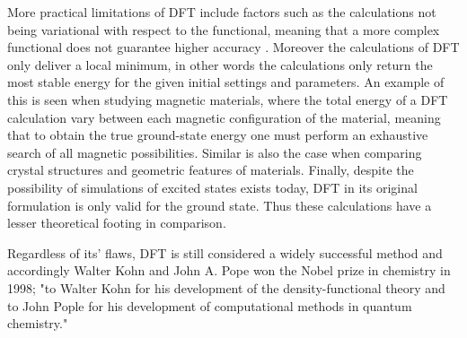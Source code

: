 More practical limitations of DFT include factors such as the calculations not being variational with respect to the functional, meaning that a more complex functional does not guarantee higher accuracy \cite{dft_forum}. Moreover the calculations of DFT only deliver a local minimum, in other words the calculations only return the most stable energy for the given initial settings and parameters. An example of this is seen when studying magnetic materials, where the total energy of a DFT calculation vary between each magnetic configuration of the material, meaning that to obtain the true ground-state energy one must perform an exhaustive search of all magnetic possibilities. Similar is also the case when comparing crystal structures and geometric features of materials. Finally, despite the possibility of simulations of excited states exists today, DFT in its original formulation is only valid for the ground state. Thus these calculations have a lesser theoretical footing in comparison.

Regardless of its' flaws, DFT is still considered a widely successful method and accordingly Walter Kohn and John A. Pope won the Nobel prize in chemistry in 1998; "to Walter Kohn for his development of the density-functional theory and to John Pople for his development of computational methods in quantum chemistry." \cite{nobelPrize}